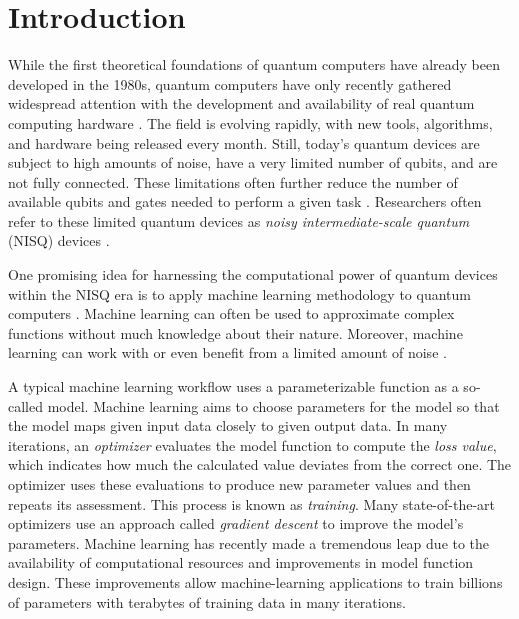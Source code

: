\chapter{Introduction}
\label{chap:intro}


While the first theoretical foundations of quantum computers have already been
developed in the 1980s, quantum computers have only recently gathered widespread
attention with the development and availability of real quantum computing
hardware \cite{nielsen_quantum_2007,hidary_quantum_2021}.
The field is evolving rapidly, with new tools, algorithms, and hardware being
released every month.
Still, today's quantum devices are subject to high amounts of noise, have a very
limited number of qubits, and are not fully connected.
These limitations often further reduce the number of available qubits and gates
needed to perform a given task \cite{cerezo_variational_2021}.
Researchers often refer to these limited quantum devices as
\emph{noisy intermediate-scale quantum} (NISQ) devices
\cite{preskill_quantum_2018}.

One promising idea for harnessing the computational power of quantum devices
within the NISQ era is to apply machine learning methodology to quantum
computers \cite{cerezo_variational_2021}.
Machine learning can often be used to approximate complex functions without much
knowledge about their nature.
Moreover, machine learning can work with or even benefit from a limited amount
of noise \cite{ciliberto_quantum_2018}.

A typical machine learning workflow uses a parameterizable function as a
so-called model.
Machine learning aims to choose parameters for the model so that the model maps
given input data closely to given output data.
In many iterations, an \emph{optimizer} evaluates the model function to compute
the \emph{loss value}, which indicates how much the calculated value deviates
from the correct one.
The optimizer uses these evaluations to produce new parameter values and then
repeats its assessment.
This process is known as \emph{training}.
Many state-of-the-art optimizers use an approach called \emph{gradient descent}
to improve the model's parameters.
Machine learning has recently made a tremendous leap due to the availability of
computational resources and improvements in model function design.
These improvements allow machine-learning applications to train billions of
parameters with terabytes of training data in many iterations.

